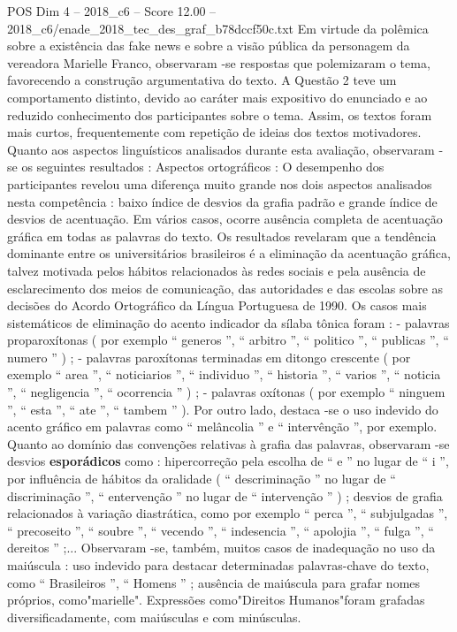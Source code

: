 \begin{textsample}{POS Dim 4 – 2018\_c6 – Score 12.00 – 2018\_c6/enade\_2018\_tec\_des\_graf\_b78dccf50c.txt}
Em virtude da polêmica sobre a existência das fake news e sobre a visão pública da personagem da vereadora Marielle Franco, observaram -se respostas que polemizaram o tema, favorecendo a construção argumentativa do texto.
A Questão 2 teve um comportamento distinto, devido ao caráter mais expositivo do enunciado e ao reduzido conhecimento dos participantes sobre o tema.
Assim, os textos foram mais curtos, frequentemente com repetição de ideias dos textos motivadores.
Quanto aos aspectos linguísticos analisados durante esta avaliação, observaram -se os seguintes resultados : Aspectos ortográficos : O desempenho dos participantes revelou uma diferença muito grande nos dois aspectos analisados nesta competência : baixo índice de desvios da grafia padrão e grande índice de desvios de acentuação.
Em vários casos, ocorre ausência completa de acentuação gráfica em todas as palavras do texto.
Os resultados revelaram que a tendência dominante entre os universitários brasileiros é a eliminação da acentuação gráfica, talvez motivada pelos hábitos relacionados às redes sociais e pela ausência de esclarecimento dos meios de comunicação, das autoridades e das escolas sobre as decisões do Acordo Ortográfico da Língua Portuguesa de 1990.
Os casos mais sistemáticos de eliminação do acento indicador da sílaba tônica foram : - palavras proparoxítonas ( por exemplo “ generos ”, “ arbitro ”, “ politico ”, “ publicas ”, “ numero ” ) ; - palavras paroxítonas terminadas em ditongo crescente ( por exemplo “ area ”, “ noticiarios ”, “ individuo ”, “ historia ”, “ varios ”, “ noticia ”, “ negligencia ”, “ ocorrencia ” ) ; - palavras oxítonas ( por exemplo “ ninguem ”, “ esta ”, “ ate ”, “ tambem ” ).
Por outro lado, destaca -se o uso indevido do acento gráfico em palavras como “ melâncolia ” e “ intervênção ”, por exemplo.
Quanto ao domínio das convenções relativas à grafia das palavras, observaram -se desvios \textbf{esporádicos} como : hipercorreção pela escolha de “ e ” no lugar de “ i ”, por influência de hábitos da oralidade ( “ descriminação ” no lugar de “ discriminação ”, “ entervenção ” no lugar de “ intervenção ” ) ; desvios de grafia relacionados à variação diastrática, como por exemplo “ perca ”, “ subjulgadas ”, “ precoseito ”, “ soubre ”, “ vecendo ”, “ indesencia ”, “ apolojia ”, “ fulga ”, “ dereitos ” ;...
Observaram -se, também, muitos casos de inadequação no uso da maiúscula : uso indevido para destacar determinadas palavras-chave do texto, como “ Brasileiros ”, “ Homens ” ; ausência de maiúscula para grafar nomes próprios, como"marielle".
Expressões como"Direitos Humanos"foram grafadas diversificadamente, com maiúsculas e com minúsculas.

\end{textsample}
